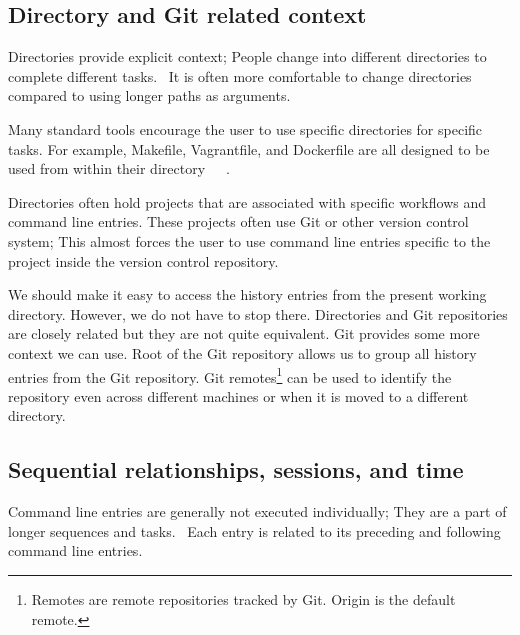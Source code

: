 \documentclass[thesis=M,english]{FITthesis}[2012/10/20]
\let\myCite\cite
\renewcommand\cite{\unskip~\myCite}
\begin{document}

\subsection{Directory and Git related context}

Directories provide explicit context; People change into different directories to complete different tasks.\cite{greenberg1993computer} It is often more comfortable to change directories compared to using longer paths as arguments. 

Many standard tools encourage the user to use specific directories for specific tasks. 
For example, Makefile, Vagrantfile, and Dockerfile are all designed to be used from within their directory\cite{man-make}\cite{docs-vagrantfile}\cite{docs-dockerfile}. 

Directories often hold projects that are associated with specific workflows and command line entries. 
These projects often use Git or other version control system; This almost forces the user to use command line entries specific to the project inside the version control repository. 

We should make it easy to access the history entries from the present working directory.
However, we do not have to stop there. Directories and Git repositories are closely related but they are not quite equivalent. Git provides some more context we can use. 
Root of the Git repository allows us to group all history entries from the Git repository.
Git remotes\footnote{Remotes are remote repositories tracked by Git. Origin is the default remote.} can be used to identify the repository even across different machines or when it is moved to a different directory. 




\subsection{Sequential relationships, sessions, and time}


Command line entries are generally not executed individually; They are a part of longer sequences and tasks.\cite{greenberg1993computer} Each entry is related to its preceding and following command line entries. 
\end{document}
